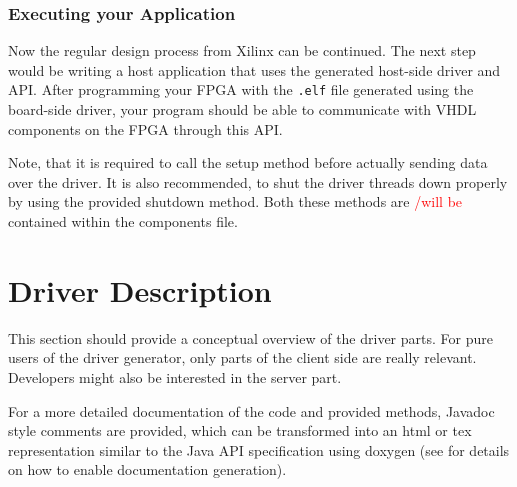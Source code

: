 \documentclass{report}
\begin{document}
\subsection{Executing your Application}
Now the regular design process from Xilinx can be continued. The next step would be writing a host application that uses the generated host-side driver and API. After programming your FPGA with the \texttt{.elf} file generated using the board-side driver, your program should be able to communicate with VHDL components on the FPGA through this API.

Note, that it is required to call the setup method before actually sending data over the driver. It is also recommended, to shut the driver threads down properly by using the provided shutdown method. Both these methods are \textcolor{red}{/will be} contained within the components file.

\chapter{Driver Description}
This section should provide a conceptual overview of the driver parts. For pure users of the driver generator, only parts of the client side are really relevant. Developers might also be interested in the server part.

For a more detailed documentation of the code and provided methods, Javadoc style comments are provided, which can be transformed into an html or tex representation similar to the Java API specification using doxygen (see  for details on how to enable documentation generation).
\end{document}
